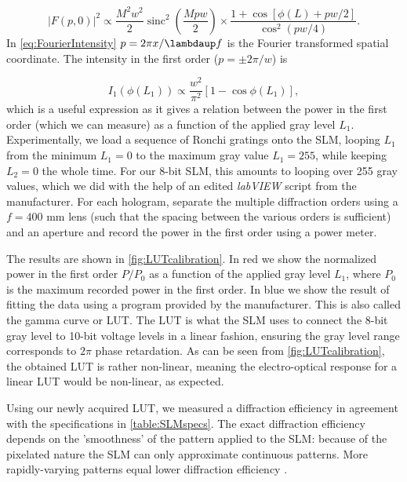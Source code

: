 \begin{equation}\label{eq:FourierIntensity}
    |F(p,0)|^2\propto
    \frac{M^2 w^2}{2}\operatorname{sinc}^2\left(\frac{M p w}{2}\right) \times
    \frac{1 + \cos{\left[\phi(L)+p w/2\right]}}{\cos^2(p w/4)}.
\end{equation}
In \cref{eq:FourierIntensity} $p=2\pi x/\lambdaup f$ is the Fourier transformed spatial coordinate. The intensity in the first order ($p=\pm 2\pi/w$) is

\begin{equation}\label{eq:IntensityFirstOrder}
    I_1(\phi(L_1)) \propto
    \frac{w^2}{\pi^2} \left[ 
    1-\cos{\phi(L_1)}
    \right],
\end{equation}
which is a useful expression as it gives a relation between the power in the first order (which we can measure) as a function of the applied gray level $L_1$.
Experimentally, we load a sequence of Ronchi gratings onto the SLM, looping $L_1$ from the minimum $L_1=0$ to the maximum gray value $L_1=255$, while keeping $L_2 =0$ the whole time.
For our 8-bit SLM, this amounts to looping over 255 gray values, which we did with the help of an edited \textit{labVIEW} script from the manufacturer.
For each hologram, separate the multiple diffraction orders using a $f=400$ mm lens (such that the spacing between the various orders is sufficient) and an aperture and record the power in the first order using a power meter.

The results are shown in \cref{fig:LUTcalibration}. 
In red we show the normalized power in the first order $P/P_0$ as a function of the applied gray level $L_1$, where $P_0$ is the maximum recorded power in the first order.
In blue we show the result of fitting the data using a program provided by the manufacturer.
This is also called the gamma curve or \ac{LUT}.
The LUT is what the SLM uses to connect the 8-bit gray level to 10-bit voltage levels in a linear fashion, ensuring the gray level range corresponds to $2\pi$ phase retardation.
As can be seen from \cref{fig:LUTcalibration}, the obtained LUT is rather non-linear, meaning the electro-optical response for a linear LUT would be non-linear, as expected. 

Using our newly acquired LUT, we measured a diffraction efficiency in agreement with the specifications in \cref{table:SLMspecs}. 
The exact diffraction efficiency depends on the 'smoothness' of the pattern applied to the SLM: because of the pixelated nature the SLM can only approximate continuous patterns. 
More rapidly-varying patterns equal lower diffraction efficiency \cite{Labuhn2016}.

